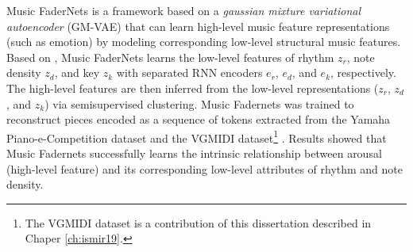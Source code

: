Music FaderNets \cite{tan2020music} is a framework based on a \textit{gaussian mixture variational autoencoder} (GM-VAE) that can learn high-level music feature representations (such as emotion) by modeling corresponding low-level structural music features. Based on \citet{yang2019deep}, Music FaderNets learns the low-level features of rhythm $z_r$, note density $z_d$, and key $z_k$ with separated RNN encoders $e_r$, $e_d$, and $e_k$, respectively. The high-level features are then inferred from the low-level representations ($z_r$, $z_d$, and $z_k$) via semisupervised clustering. Music Fadernets was trained to reconstruct pieces encoded as a sequence of tokens \cite{oore2017learning} extracted from the Yamaha Piano-e-Competition dataset \cite{yamahaEPiano} and the VGMIDI dataset\footnote{The VGMIDI dataset is a contribution of this dissertation described in Chaper \ref{ch:ismir19}.} \cite{ferreira_2019}. Results showed that Music Fadernets successfully learns the intrinsic relationship between arousal (high-level feature) and its corresponding low-level attributes of rhythm and note density.


